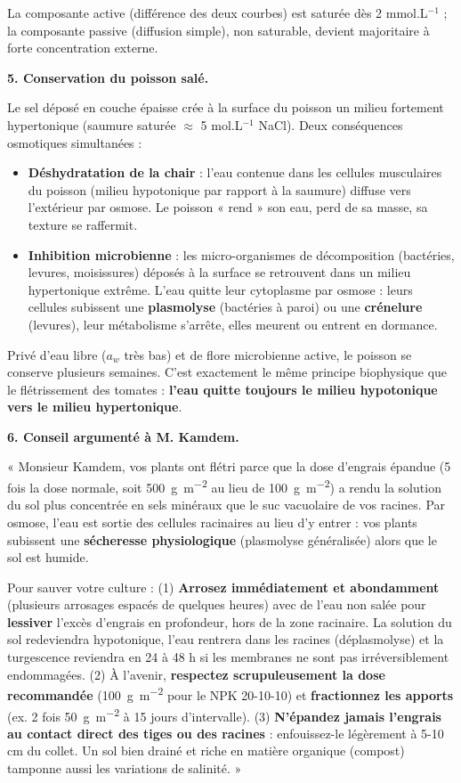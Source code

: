 \documentclass[11pt]{article}
\newcommand{\cle}[1]{{\popxbold\color{popdark}#1}}
\begin{document}
\begin{exoresolu}
La composante active (différence des deux courbes) est saturée dès 2 mmol.L$^{-1}$ ; la composante passive (diffusion simple), non saturable, devient majoritaire à forte concentration externe.

\textbf{5. Conservation du poisson salé.}

Le sel déposé en couche épaisse crée à la surface du poisson un milieu fortement \cle{hypertonique} (saumure saturée $\approx$ 5 mol.L$^{-1}$ NaCl). Deux conséquences osmotiques simultanées :
\begin{itemize}
\item \textbf{Déshydratation de la chair} : l'eau contenue dans les cellules musculaires du poisson (milieu hypotonique par rapport à la saumure) diffuse vers l'extérieur par osmose. Le poisson « rend » son eau, perd de sa masse, sa texture se raffermit.
\item \textbf{Inhibition microbienne} : les micro-organismes de décomposition (bactéries, levures, moisissures) déposés à la surface se retrouvent dans un milieu hypertonique extrême. L'eau quitte leur cytoplasme par osmose : leurs cellules subissent une \textbf{plasmolyse} (bactéries à paroi) ou une \textbf{crénelure} (levures), leur métabolisme s'arrête, elles meurent ou entrent en dormance.
\end{itemize}
Privé d'eau libre ($a_w$ très bas) et de flore microbienne active, le poisson se conserve plusieurs semaines. C'est exactement le même principe biophysique que le flétrissement des tomates : \textbf{l'eau quitte toujours le milieu hypotonique vers le milieu hypertonique}.

\textbf{6. Conseil argumenté à M. Kamdem.}

« Monsieur Kamdem, vos plants ont flétri parce que la dose d'engrais épandue (5 fois la dose normale, soit \SI{500}{g.m^{-2}} au lieu de \SI{100}{g.m^{-2}}) a rendu la solution du sol plus concentrée en sels minéraux que le suc vacuolaire de vos racines. Par osmose, l'eau est sortie des cellules racinaires au lieu d'y entrer : vos plants subissent une \textbf{sécheresse physiologique} (plasmolyse généralisée) alors que le sol est humide.

Pour sauver votre culture : (1) \textbf{Arrosez immédiatement et abondamment} (plusieurs arrosages espacés de quelques heures) avec de l'eau non salée pour \textbf{lessiver} l'excès d'engrais en profondeur, hors de la zone racinaire. La solution du sol redeviendra hypotonique, l'eau rentrera dans les racines (déplasmolyse) et la turgescence reviendra en 24 à 48 h si les membranes ne sont pas irréversiblement endommagées. (2) À l'avenir, \textbf{respectez scrupuleusement la dose recommandée} (\SI{100}{g.m^{-2}} pour le NPK 20-10-10) et \textbf{fractionnez les apports} (ex. 2 fois \SI{50}{g.m^{-2}} à 15 jours d'intervalle). (3) \textbf{N'épandez jamais l'engrais au contact direct des tiges ou des racines} : enfouissez-le légèrement à 5-10 cm du collet. Un sol bien drainé et riche en matière organique (compost) tamponne aussi les variations de salinité. »
\end{exoresolu}
\end{document}
